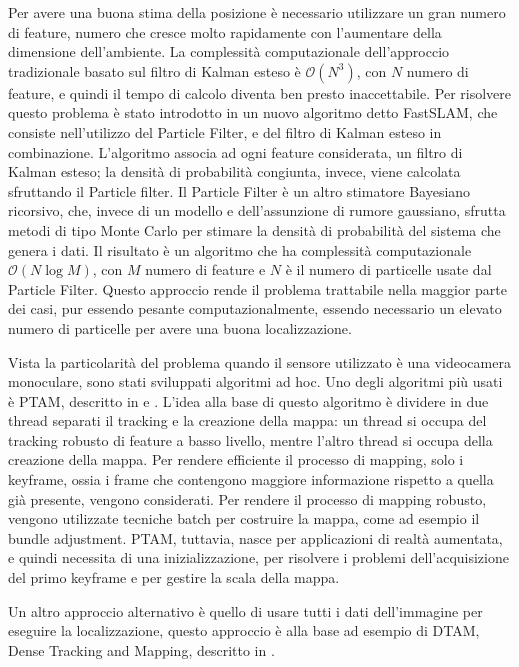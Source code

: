 Per avere una buona stima della posizione è necessario utilizzare un gran numero di feature, numero che cresce molto rapidamente con l'aumentare della dimensione dell'ambiente.
La complessità computazionale dell'approccio tradizionale basato sul filtro di Kalman esteso è $\mathcal{O}(N^3)$, con $N$ numero di feature, e quindi il tempo di calcolo diventa ben presto inaccettabile.
Per risolvere questo problema è stato introdotto in \cite{Montemerlo02a}  un nuovo algoritmo detto FastSLAM, che consiste nell'utilizzo del Particle Filter, e del filtro di Kalman esteso in combinazione. L'algoritmo associa ad ogni feature considerata, un filtro di Kalman esteso; la densità di probabilità congiunta, invece, viene calcolata sfruttando il Particle filter. 
Il Particle Filter è un altro stimatore Bayesiano ricorsivo, che, invece di un modello e dell'assunzione di rumore gaussiano, sfrutta metodi di tipo Monte Carlo per stimare la densità di probabilità del sistema che genera i dati.
Il risultato è un algoritmo che ha complessità computazionale $\mathcal{O}(N\log M)$, con $M$ numero di feature e $N$ è il numero di particelle usate dal Particle Filter. 
Questo approccio rende il problema trattabile nella maggior parte dei casi, pur essendo pesante computazionalmente, essendo necessario un elevato numero di particelle per avere una buona localizzazione.

Vista la particolarità del problema quando il sensore utilizzato è una videocamera monoculare, sono stati sviluppati algoritmi ad hoc.
Uno degli algoritmi più usati è PTAM, descritto in \cite{klein07parallel} e \cite{klein08improving}.
L'idea alla base di questo algoritmo è dividere in due thread separati il tracking e la creazione della mappa: un thread si occupa del tracking robusto di feature a basso livello, mentre l'altro thread si occupa della creazione della mappa. 
Per rendere efficiente il processo di mapping, solo i keyframe, ossia i frame che contengono maggiore informazione rispetto a quella già presente, vengono considerati.
Per rendere il processo di mapping robusto, vengono utilizzate tecniche batch per costruire la mappa, come ad esempio il bundle adjustment.
PTAM, tuttavia, nasce per applicazioni di realtà aumentata, e quindi necessita di una inizializzazione, per risolvere i problemi dell'acquisizione del primo keyframe e per gestire la scala della mappa.

Un altro approccio alternativo è quello di usare tutti i dati dell'immagine per eseguire la localizzazione, questo approccio è alla base ad esempio di DTAM, Dense Tracking and Mapping, descritto in \cite{conf/iccv/NewcombeLD11}.

